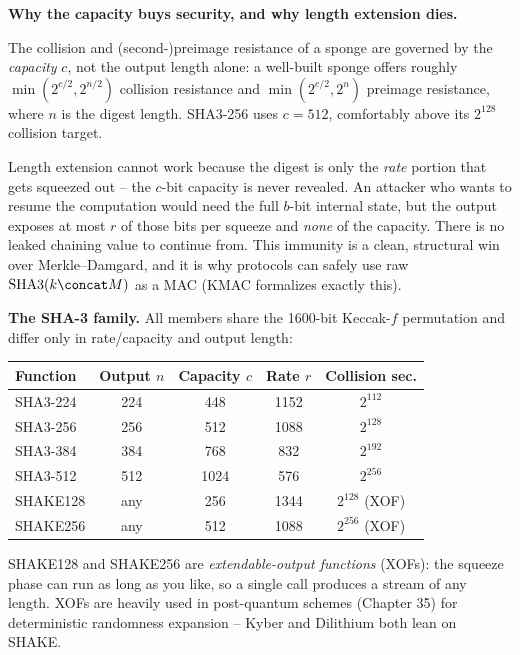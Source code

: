 \begin{whybox}
\textbf{Why the capacity buys security, and why length extension dies.}

The collision and (second-)preimage resistance of a sponge are governed by the \emph{capacity} $c$, not the output length alone: a well-built sponge offers roughly $\min(2^{c/2}, 2^{n/2})$ collision resistance and $\min(2^{c/2}, 2^{n})$ preimage resistance, where $n$ is the digest length. SHA3-256 uses $c = 512$, comfortably above its $2^{128}$ collision target.

Length extension cannot work because the digest is only the \emph{rate} portion that gets squeezed out -- the $c$-bit capacity is never revealed. An attacker who wants to resume the computation would need the full $b$-bit internal state, but the output exposes at most $r$ of those bits per squeeze and \emph{none} of the capacity. There is no leaked chaining value to continue from. This immunity is a clean, structural win over Merkle--Damgard, and it is why protocols can safely use raw $\text{SHA3}(k \concat M)$ as a MAC (KMAC formalizes exactly this).
\end{whybox}

\begin{focusbox}
\textbf{The SHA-3 family.} All members share the 1600-bit Keccak-$f$ permutation and differ only in rate/capacity and output length:
\begin{center}
\begin{tabular}{lcccc}
\toprule
Function & Output $n$ & Capacity $c$ & Rate $r$ & Collision sec. \\
\midrule
SHA3-224 & 224 & 448 & 1152 & $2^{112}$ \\
SHA3-256 & 256 & 512 & 1088 & $2^{128}$ \\
SHA3-384 & 384 & 768 & 832  & $2^{192}$ \\
SHA3-512 & 512 & 1024& 576  & $2^{256}$ \\
SHAKE128 & any & 256 & 1344 & $2^{128}$ (XOF) \\
SHAKE256 & any & 512 & 1088 & $2^{256}$ (XOF) \\
\bottomrule
\end{tabular}
\end{center}
SHAKE128 and SHAKE256 are \emph{extendable-output functions} (XOFs): the squeeze phase can run as long as you like, so a single call produces a stream of any length. XOFs are heavily used in post-quantum schemes (Chapter 35) for deterministic randomness expansion -- Kyber and Dilithium both lean on SHAKE.
\end{focusbox}

